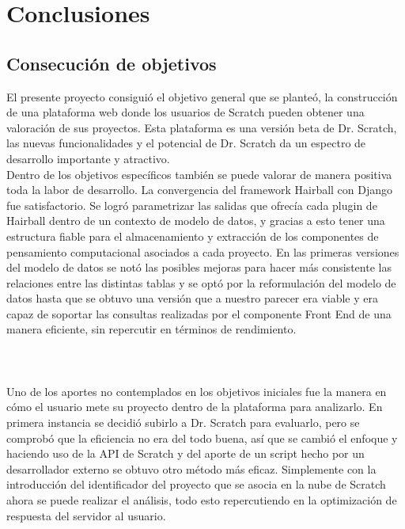 \documentclass[a4paper, 12pt]{book}
\begin{document}

\cleardoublepage
\chapter{Conclusiones}
\label{chap:conclusiones}


\section{Consecución de objetivos}
\label{sec:consecucion-objetivos}

El presente proyecto consiguió el objetivo general que se planteó, la 
construcción de una plataforma web donde los usuarios de Scratch pueden 
obtener una valoración de sus proyectos. Esta plataforma es una versión
beta de Dr. Scratch, las nuevas funcionalidades y el potencial de Dr. 
Scratch da un espectro de desarrollo importante y atractivo. \\

Dentro de los objetivos específicos también se puede valorar de manera
positiva toda la labor de desarrollo. La convergencia del framework
Hairball con Django fue satisfactorio. Se logró parametrizar las salidas
que ofrecía cada plugin de Hairball dentro de un contexto de modelo de
datos, y gracias a esto tener una estructura fiable para el almacenamiento
y extracción de los componentes de pensamiento computacional asociados
a cada proyecto. En las primeras versiones del modelo de datos se notó
las posibles mejoras para hacer más consistente las relaciones entre las
distintas tablas y se optó por la reformulación del modelo de datos hasta
que se obtuvo una versión que a nuestro parecer era viable y era capaz
de soportar las consultas realizadas por el componente Front End de una
manera eficiente, sin repercutir en términos de rendimiento. \\ \\ \\ \\

Uno de los aportes no contemplados en los objetivos iniciales fue la
manera en cómo el usuario mete su proyecto dentro de la plataforma
para analizarlo. En primera instancia se decidió subirlo a Dr. Scratch
para evaluarlo, pero se comprobó que la eficiencia no era del todo
buena, así que se cambió el enfoque y haciendo uso de la API de Scratch
y del aporte de un script hecho por un desarrollador externo se 
obtuvo otro método más eficaz. Simplemente con la introducción del 
identificador del proyecto que se asocia en la nube de Scratch ahora
se puede realizar el análisis, todo esto repercutiendo en la optimización 
de respuesta del servidor al usuario. \\
\end{document}
